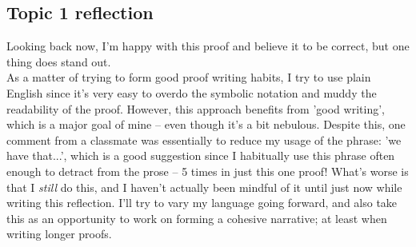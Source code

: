 \documentclass[11pt, letterpaper]{article}
\begin{document}
\begin{center}    
\end{center}
\subsection*{Topic 1 reflection}
Looking back now, I'm happy with this proof and believe it to be correct, but one thing does stand out.\\ 
As a matter of trying to form good proof writing habits, I try to use plain English since it's very easy to overdo the symbolic notation 
and muddy the readability of the proof. However, this approach benefits from 'good writing', which is a major goal of mine -- even though it's a bit nebulous. 
Despite this, one comment from a classmate was essentially to reduce my usage of the phrase: 'we have that...', which is a good suggestion since I habitually use this phrase
often enough to detract from the prose -- 5 times in just this one proof! What's worse is that I {\it still} do this, and
I haven't actually been mindful of it until just now while writing this reflection. I'll try to vary my language going forward,
and also take this as an opportunity to work on forming a cohesive narrative; at least when writing longer proofs.   
\newpage
\end{document}
